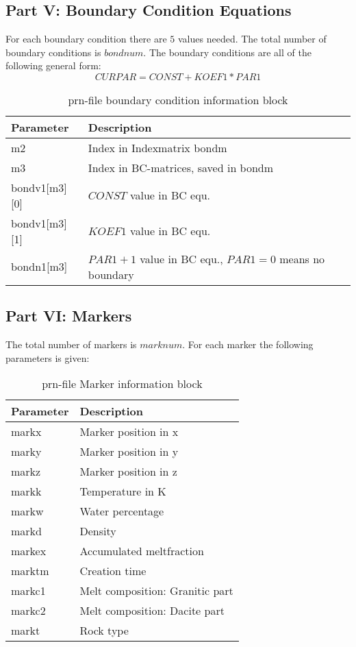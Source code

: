 \subsection{Part V: Boundary Condition Equations}

For each boundary condition there are $5$ values needed. The total number of boundary conditions is $bondnum$. The boundary conditions are all of the following general form:
$$CURPAR = CONST + KOEF1*PAR1$$

\begin{table}[H]
\small
\centering
\begin{tabular}{l p{9cm}}
\toprule
Parameter & Description\\
\midrule
m2 & Index in Indexmatrix bondm\\ 
m3 & Index in BC-matrices, saved in bondm \\ 
bondv1[m3][0] &  $CONST$ value in BC equ. \\ 
bondv1[m3][1] &  $KOEF1$ value in BC equ. \\ 
bondn1[m3] & $PAR1+1$ value in BC equ., $PAR1=0$ means no boundary \\ 
\bottomrule
\end{tabular}
\caption{prn-file boundary condition information block}
\label{tbl:prn_bond_info}
\end{table}

\subsection{Part VI: Markers}

The total number of markers is $marknum$. For each marker the following parameters is given:

\begin{table}[H]
\small
\centering
\begin{tabular}{l p{8cm}}
\toprule
Parameter & Description\\
\midrule
markx & Marker position in x \\ 
marky & Marker position in y \\ 
markz & Marker position in z \\ 
markk & Temperature in K \\ 
markw & Water percentage \\ 
markd & Density \\ 
markex & Accumulated meltfraction \\ 
marktm & Creation time \\ 
markc1 & Melt composition: Granitic part \\ 
markc2 & Melt composition: Dacite part \\
markt  & Rock type \\
\bottomrule
\end{tabular}
\caption{prn-file Marker information block}
\label{tbl:prn_marker_info}
\end{table}